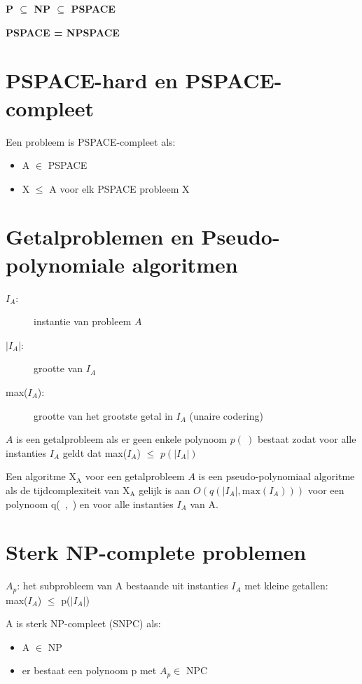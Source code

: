 \documentclass[]{article}
\begin{document}
\medskip

\textbf{P $\subseteq$ NP $\subseteq$ PSPACE}

\textbf{PSPACE = NPSPACE}

\section*{PSPACE-hard en PSPACE-compleet}

Een probleem is PSPACE-compleet als:

\begin{itemize}
\item A $\in$ PSPACE
\item X $\leq$ A voor elk PSPACE probleem X
\end{itemize}

\section*{Getalproblemen en Pseudo-polynomiale algoritmen}

\begin{description}
\item[$I_A$:] instantie van probleem $A$
\item[$|I_A|$:] grootte van $I_A$
\item[max($I_A$):] grootte van het grootste getal in $I_A$ (unaire codering)
\end{description}

$A$ is een getalprobleem als er geen enkele polynoom $p(~)$ bestaat zodat voor alle instanties $I_A$ geldt dat max($I_A$) $\leq$ $p(|I_A|)$

\medskip

Een algoritme X$_\text{A}$ voor een getalprobleem $A$ is een pseudo-polynomiaal algoritme als de tijdcomplexiteit van X$_\text{A}$ gelijk is aan $O(q(|I_A|, \text{max}(I_A)))$ voor een polynoom q(~,~) en voor alle instanties $I_A$ van A.

\section*{Sterk NP-complete problemen}

$A_p$: het subprobleem van A bestaande uit instanties $I_A$ met kleine getallen: \\
max($I_A$) $\leq$ p($|I_A|$)

A is sterk NP-compleet (SNPC) als:

\begin{itemize}
\item A $\in$ NP
\item er bestaat een polynoom p met $A_p \in$ NPC
\end{itemize}
\end{document}
